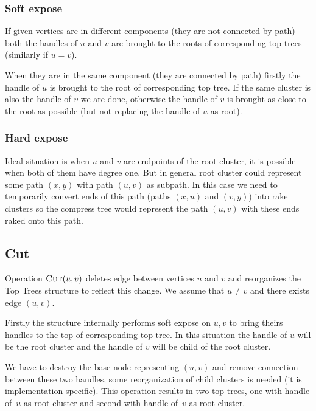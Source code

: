 \subsubsection{Soft expose}

If given vertices are in different components (they are not connected by path) both the
handles of $u$ and $v$ are brought to the roots of corresponding top trees
(similarly if $u=v$).

When they are in the same component (they are connected by path) firstly the
handle of $u$ is brought to the root of corresponding top tree. If the same
cluster is also the handle of $v$ we are done, otherwise the handle of $v$ is
brought as close to the root as possible (but not replacing the handle of $u$ as
root).

\subsubsection{Hard expose}

Ideal situation is when $u$ and $v$ are endpoints of the root cluster, it is
possible when both of them have degree one. But in general root cluster could
represent some path $(x,y)$ with path $(u,v)$ as subpath. In this case we need
to temporarily convert ends of this path (paths $(x,u)$ and $(v,y)$) into rake
clusters so the compress tree would represent the path $(u,v)$ with these ends
raked onto this path.


\subsection{Cut}

Operation $\hbox{\sc Cut}(u,v)$ deletes edge between vertices $u$ and $v$ and reorganizes
the Top Trees structure to reflect this change. We assume that $u\ne v$ and
there exists edge $(u,v)$.

Firstly the structure internally performs {\I soft expose} on $u,v$ to bring
theirs handles to the top of corresponding top tree. In this situation the
handle of $u$ will be the root cluster and the handle of $v$ will be child of
the root cluster.

We have to destroy the base node representing $(u,v)$ and remove connection
between these two handles, some reorganization of child clusters is needed (it
is implementation specific). This operation results in two top trees, one with
handle of~$u$ as root cluster and second with handle of~$v$ as root cluster.

